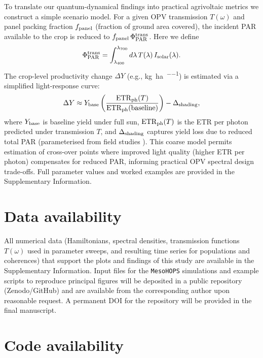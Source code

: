 \documentclass[aps,prb,onecolumn,superscriptaddress,notitlepage,nofootinbib,longbibliography,10pt]{revtex4-2}
\begin{document}
To translate our quantum-dynamical findings into practical agrivoltaic metrics we construct a simple scenario model. For a given OPV transmission $T(\omega)$ and panel packing fraction $f_{\rm panel}$ (fraction of ground area covered), the incident PAR available to the crop is reduced to $f_{\rm panel}\,\Phi_{\rm PAR}^{\rm trans}$. Here we define
\begin{equation*}
\Phi_{\rm PAR}^{\rm trans}=\int_{\lambda_{400}}^{\lambda_{700}} d\lambda\,T(\lambda)\,I_{\rm solar}(\lambda).
\end{equation*}
The crop-level productivity change $\Delta Y$ (e.g., \si{\kilogram\per\hectare\per\yr}) is estimated via a simplified light-response curve:
\begin{equation}
\Delta Y \approx Y_{\rm base}\left(\frac{\mathrm{ETR}_{\rm ph}(T)}{\mathrm{ETR}_{\rm ph}(\mathrm{baseline})}\right) - \Delta_{\rm shading},
\end{equation}
where $Y_{\rm base}$ is baseline yield under full sun, $\mathrm{ETR}_{\rm ph}(T)$ is the ETR per photon predicted under transmission $T$, and $\Delta_{\rm shading}$ captures yield loss due to reduced total PAR (parameterised from field studies \cite{Scarano2024, Adeyemi2025}). This coarse model permits estimation of cross-over points where improved light quality (higher ETR per photon) compensates for reduced PAR, informing practical OPV spectral design trade-offs. Full parameter values and worked examples are provided in the Supplementary Information.


\section*{Data availability}

All numerical data (Hamiltonians, spectral densities, transmission functions $T(\omega)$ used in parameter sweeps, and resulting time series for populations and coherences) that support the plots and findings of this study are available in the Supplementary Information. Input files for the \texttt{MesoHOPS} simulations and example scripts to reproduce principal figures will be deposited in a public repository (Zenodo/GitHub) and are available from the corresponding author upon reasonable request. A permanent DOI for the repository will be provided in the final manuscript.

\section*{Code availability}
\end{document}
